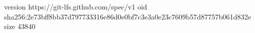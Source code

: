 version https://git-lfs.github.com/spec/v1
oid sha256:2e73bff8bb37d797733316e86d0e0bf7c3e3a0e23c7609b57d87757b061d832e
size 43840
